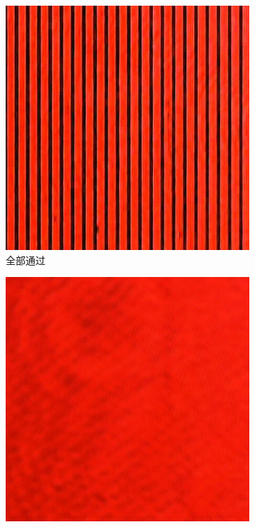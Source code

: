 \documentclass[a4paper]{article}
\begin{document}
\begin{figure}[H]\ContinuedFloat
    \centering
    \begin{subfigure}[t]{0.3\textwidth}
        \centering
        \includegraphics[width=\textwidth]{img2-done/3-1.JPG}
        \caption{全部通过}
        \label{fig3-4-1}
    \end{subfigure}
    \begin{subfigure}[t]{0.3\textwidth}
        \centering
        \includegraphics[width=\textwidth]{img2-done/3-2.JPG}

\end{subfigure}
\end{figure}
\end{document}
